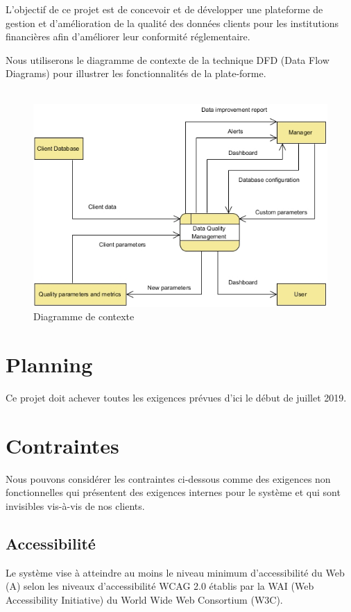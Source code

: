 \documentclass[oneside]{book}
\begin{document}
L'objectif de ce projet est de concevoir et de développer une plateforme de gestion et d'amélioration de la qualité des données clients pour les institutions financières afin d'améliorer leur conformité réglementaire.

Nous utiliserons le diagramme de contexte de la technique DFD (Data Flow Diagrams) pour illustrer les fonctionnalités de la plate-forme. 
\\
\\

\begin{figure}[h!]
  \caption{Diagramme de contexte}
  \includegraphics[width=\textwidth]{img/Context_DFD.jpg}
\end{figure}


\section{Planning}

Ce projet doit achever toutes les exigences prévues d'ici le début de juillet 2019.

\section{Contraintes}
Nous pouvons considérer les contraintes ci-dessous comme des exigences non fonctionnelles qui présentent des exigences internes pour le système et qui sont invisibles vis-à-vis de nos clients.
\subsection{Accessibilité}
Le système vise à atteindre au moins le niveau minimum d'accessibilité du Web (A) selon les niveaux d'accessibilité WCAG 2.0 établis par la WAI (Web Accessibility Initiative) du World Wide Web Consortium (W3C).
\end{document}
